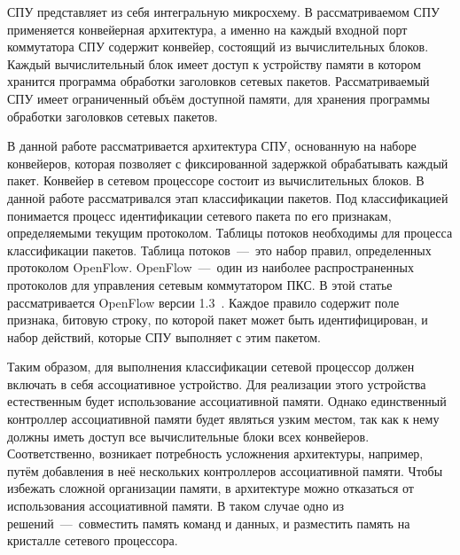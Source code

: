 \documentclass[oneside,final,12pt]{extarticle}
\begin{document}
        СПУ представляет из себя интегральную микросхему. В рассматриваемом СПУ применяется 
        конвейерная архитектура, а именно на каждый входной порт коммутатора СПУ содержит 
        конвейер, состоящий из вычислительных блоков. Каждый вычислительный блок имеет доступ к 
        устройству памяти в котором хранится программа обработки заголовков сетевых пакетов. 
        Рассматриваемый СПУ имеет ограниченный объём доступной
        памяти, для хранения программы обработки заголовков сетевых пакетов.
        
        В данной работе рассматривается архитектура СПУ, 
        основанную на наборе конвейеров, которая позволяет с фиксированной задержкой 
        обрабатывать каждый пакет. Конвейер в сетевом процессоре состоит из вычислительных блоков.
        В данной работе рассматривался этап классификации пакетов. 
        Под классификацией понимается процесс идентификации сетевого пакета по его признакам, 
        определяемыми текущим протоколом.
        Таблицы потоков необходимы для процесса классификации пакетов.
        Таблица потоков~---~это набор правил, определенных протоколом OpenFlow. 
        OpenFlow~---~один из наиболее распространенных протоколов для управления сетевым 
        коммутатором ПКС. В этой статье рассматривается OpenFlow версии 1.3~\cite{openflow}. 
        Каждое правило содержит поле признака, битовую строку, по которой пакет может быть 
        идентифицирован, и набор действий, которые СПУ выполняет с этим пакетом.
        
        Таким образом, для выполнения классификации сетевой процессор должен включать в себя 
        ассоциативное устройство. Для реализации этого устройства естественным 
        будет использование ассоциативной памяти. Однако единственный контроллер ассоциативной 
        памяти будет являться узким местом, так как к нему должны иметь доступ 
        все вычислительные блоки всех конвейеров. Соответственно, возникает потребность 
        усложнения архитектуры, например, путём добавления в неё нескольких контроллеров 
        ассоциативной памяти. Чтобы избежать сложной организации памяти, в архитектуре 
        можно отказаться от использования ассоциативной памяти. В таком случае одно из 
        решений~---~совместить память команд и данных, и разместить память на кристалле 
        сетевого процессора.
 
\end{document}
